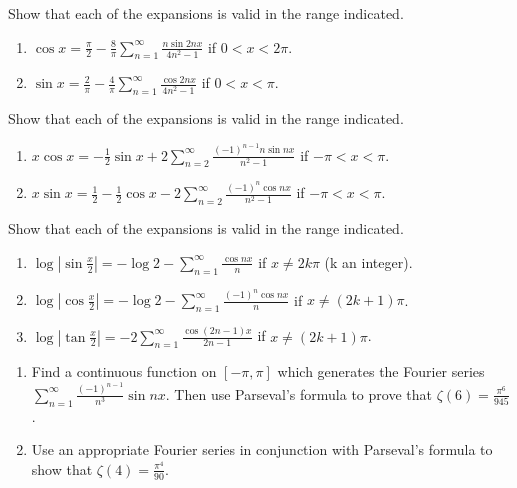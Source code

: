\begin{problembox}
Show that each of the expansions is valid in the range indicated.
\begin{enumerate}[label=(\alph*)]
\item $\cos x = \frac{\pi}{2} - \frac{8}{\pi} \sum_{n=1}^\infty \frac{n \sin 2nx}{4n^2 - 1}$ if $0 < x < 2\pi$.
\item $\sin x = \frac{2}{\pi} - \frac{4}{\pi} \sum_{n=1}^\infty \frac{\cos 2nx}{4n^2 - 1}$ if $0 < x < \pi$.
\end{enumerate}
\end{problembox}

\begin{problembox}
Show that each of the expansions is valid in the range indicated.
\begin{enumerate}[label=(\alph*)]
\item $x \cos x = -\frac{1}{2} \sin x + 2 \sum_{n=2}^\infty \frac{(-1)^{n-1} n \sin nx}{n^2 - 1}$ if $-\pi < x < \pi$.
\item $x \sin x = \frac{1}{2} - \frac{1}{2} \cos x - 2 \sum_{n=2}^\infty \frac{(-1)^n \cos nx}{n^2 - 1}$ if $-\pi < x < \pi$.
\end{enumerate}
\end{problembox}

\begin{problembox}
Show that each of the expansions is valid in the range indicated.
\begin{enumerate}[label=(\alph*)]
\item $\log \left| \sin \frac{x}{2} \right| = -\log 2 - \sum_{n=1}^\infty \frac{\cos nx}{n}$ if $x \neq 2k\pi$ (k an integer).
\item $\log \left| \cos \frac{x}{2} \right| = -\log 2 - \sum_{n=1}^\infty \frac{(-1)^n \cos nx}{n}$ if $x \neq (2k + 1)\pi$.
\item $\log \left| \tan \frac{x}{2} \right| = -2 \sum_{n=1}^\infty \frac{\cos (2n - 1)x}{2n - 1}$ if $x \neq (2k + 1)\pi$.
\end{enumerate}
\end{problembox}

\begin{problembox}
\begin{enumerate}[label=(\alph*)]
\item Find a continuous function on $[-\pi, \pi]$ which generates the Fourier series $\sum_{n=1}^\infty \frac{(-1)^{n-1}}{n^3} \sin nx$. Then use Parseval's formula to prove that $\zeta(6) = \frac{\pi^6}{945}$.
\item Use an appropriate Fourier series in conjunction with Parseval's formula to show that $\zeta(4) = \frac{\pi^4}{90}$.
\end{enumerate}
\end{problembox}

